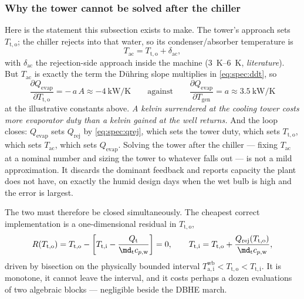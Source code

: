 \subsubsection{Why the tower cannot be solved after the chiller}
Here is the statement this subsection exists to make. The tower's approach sets $T_{\mathrm{t,o}}$;
the chiller rejects into that water, so its condenser/absorber temperature is
\begin{equation}
T_{\mathrm{ac}} = T_{\mathrm{t,o}} + \delta_{\mathrm{ac}} ,
\label{eq:spec:Tac}
\end{equation}
with $\delta_{\mathrm{ac}}$ the rejection-side approach inside the machine
(\SIrange{3}{6}{\kelvin}, \emph{literature}). But $T_{\mathrm{ac}}$ is exactly the term the D\"uhring
slope multiplies in \eqref{eq:spec:ddt}, so
\begin{equation}
\frac{\partial Q_{\mathrm{evap}}}{\partial T_{\mathrm{t,o}}} = -\,a\,A \approx
\SI{-4}{\kilo\watt\per\kelvin}
\qquad\text{against}\qquad
\frac{\partial Q_{\mathrm{evap}}}{\partial T_{\mathrm{gen}}} = a \approx
\SI{3.5}{\kilo\watt\per\kelvin}
\label{eq:spec:sens}
\end{equation}
at the illustrative constants above. \emph{A kelvin surrendered at the cooling tower costs more
evaporator duty than a kelvin gained at the well returns.} And the loop closes: $Q_{\mathrm{evap}}$
sets $Q_{\mathrm{rej}}$ by \eqref{eq:spec:qrej}, which sets the tower duty, which sets
$T_{\mathrm{t,o}}$, which sets $T_{\mathrm{ac}}$, which sets $Q_{\mathrm{evap}}$. Solving the tower
after the chiller --- fixing $T_{\mathrm{ac}}$ at a nominal number and sizing the tower to whatever
falls out --- is not a mild approximation. It discards the dominant feedback and reports capacity the
plant does not have, on exactly the humid design days when the wet bulb is high and the error is
largest.

The two must therefore be closed simultaneously. The cheapest correct implementation is a
one-dimensional residual in $T_{\mathrm{t,o}}$,
\begin{equation}
R(T_{\mathrm{t,o}}) = T_{\mathrm{t,o}}
 - \left[T_{\mathrm{t,i}} - \frac{Q_{\mathrm{t}}}{\md_{\mathrm{t}}c_{p,\mathrm{w}}}\right] = 0 ,
\qquad
T_{\mathrm{t,i}} = T_{\mathrm{t,o}} + \frac{Q_{\mathrm{rej}}(T_{\mathrm{t,o}})}
{\md_{\mathrm{t}}c_{p,\mathrm{w}}} ,
\label{eq:spec:coupled}
\end{equation}
driven by bisection on the physically bounded interval
$T_{\mathrm{a,i}}^{\mathrm{wb}} < T_{\mathrm{t,o}} < T_{\mathrm{t,i}}$. It is monotone, it cannot
leave the interval, and it costs perhaps a dozen evaluations of two algebraic blocks --- negligible
beside the DBHE march.


